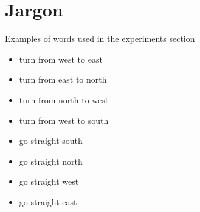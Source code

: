 \documentclass[a4paper]{article}
\begin{document}
   \section{Jargon}
      Examples of words used in the experiments section
      \begin{itemize}
         \item turn from west to east
         \item turn from east to north
         \item turn from north to west
         \item turn from west to south
         \item go straight south
         \item go straight north
         \item go straight west
         \item go straight east
      \end{itemize}


         
         
\end{document}
